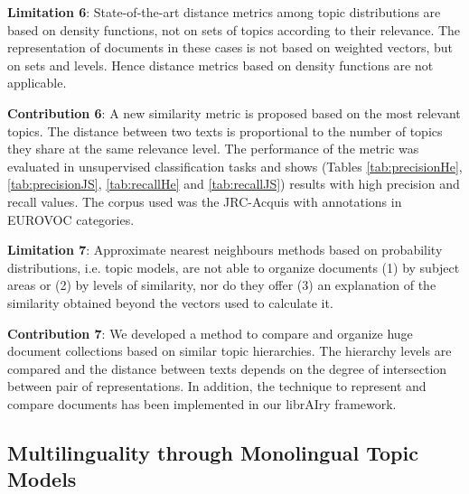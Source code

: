 \textbf{Limitation 6}: State-of-the-art distance metrics among topic distributions are based on density functions, not on sets of topics according to their relevance. The representation of documents in these cases is not based on weighted vectors, but on sets and levels. Hence distance metrics based on density functions are not applicable.

\textbf{Contribution 6}: A new similarity metric is proposed based on the most relevant topics. The distance between two texts is proportional to the number of topics they share at the same relevance level. The performance of the metric was evaluated in unsupervised classification tasks and shows (Tables \ref{tab:precisionHe}, \ref{tab:precisionJS}, \ref{tab:recallHe} and \ref{tab:recallJS}) results with high precision and recall values. The corpus used was the JRC-Acquis with annotations in EUROVOC categories.

\textbf{Limitation 7}: Approximate nearest neighbours methods based on probability distributions, i.e. topic models, are not able to organize documents (1) by subject areas or (2) by levels of similarity, nor do they offer (3) an explanation of the similarity obtained beyond the vectors used to calculate it.

\textbf{Contribution 7}: We developed a method to compare and organize huge document collections based on similar topic hierarchies. The hierarchy levels are compared and the distance between texts depends on the degree of intersection between pair of representations. In addition, the technique to represent and compare documents has been implemented in our librAIry framework.


\subsection{Multilinguality through Monolingual Topic Models}


